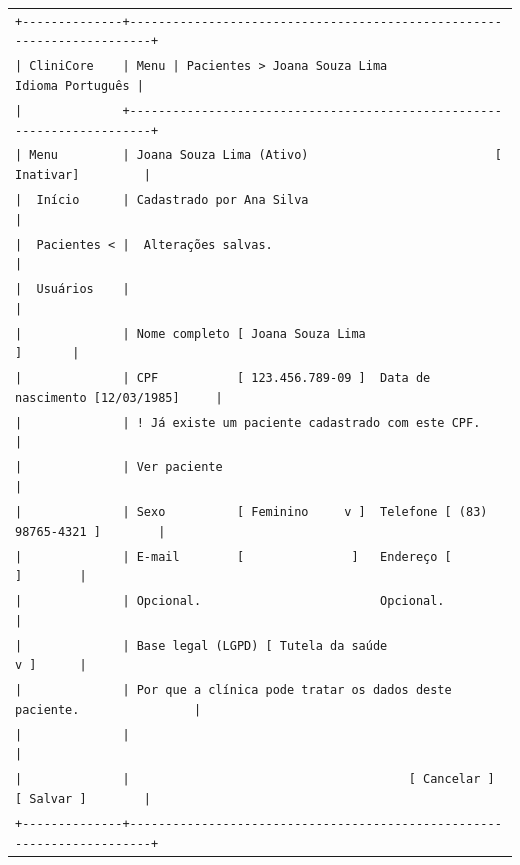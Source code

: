 \begin{center}

\begin{lrbox}{\interfaceWireframe}
\ttfamily\small
\begin{tabular}{@{}l@{}}
\verb`+--------------+-----------------------------------------------------------------------+` \\
\verb`| CliniCore    | Menu | Pacientes > Joana Souza Lima                  Idioma Português |` \\
\verb`|              +-----------------------------------------------------------------------+` \\
\verb`| Menu         | Joana Souza Lima (Ativo)                          [ Inativar]         |` \\
\verb`|  Início      | Cadastrado por Ana Silva                                              |` \\
\verb`|  Pacientes < |  Alterações salvas.                                                   |` \\
\verb`|  Usuários    |                                                                       |` \\
\verb`|              | Nome completo [ Joana Souza Lima                              ]       |` \\
\verb`|              | CPF           [ 123.456.789-09 ]  Data de nascimento [12/03/1985]     |` \\
\verb`|              | ! Já existe um paciente cadastrado com este CPF.                      |` \\
\verb`|              | Ver paciente                                                          |` \\
\verb`|              | Sexo          [ Feminino     v ]  Telefone [ (83) 98765-4321 ]        |` \\
\verb`|              | E-mail        [               ]   Endereço [                 ]        |` \\
\verb`|              | Opcional.                         Opcional.                           |` \\
\verb`|              | Base legal (LGPD) [ Tutela da saúde                          v ]      |` \\
\verb`|              | Por que a clínica pode tratar os dados deste paciente.                |` \\
\verb`|              |                                                                       |` \\
\verb`|              |                                       [ Cancelar ]  [ Salvar ]        |` \\
\verb`+--------------+-----------------------------------------------------------------------+` \\
\end{tabular}
\end{lrbox}

\resizebox{\textwidth}{!}{\usebox{\interfaceWireframe}}

\end{center}

